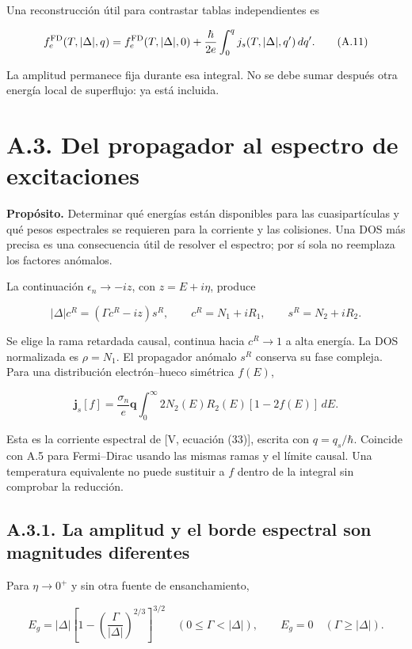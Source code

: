 \documentclass[
  spanish,
  10pt,
  a4paper,
]{article}
\begin{document}
Una reconstrucción útil para contrastar tablas independientes es

\[
f_e^{\rm FD}(T,|\Delta|,q)
=f_e^{\rm FD}(T,|\Delta|,0)
+\frac{\hbar}{2e}\int_0^q j_s(T,|\Delta|,q')\,dq'.
\tag{A.11}
\]

La amplitud permanece fija durante esa integral. No se debe sumar
después otra energía local de superflujo: ya está incluida.

\section{A.3. Del propagador al espectro de
excitaciones}\label{a.3.-del-propagador-al-espectro-de-excitaciones}

\textbf{Propósito.} Determinar qué energías están disponibles para las
cuasipartículas y qué pesos espectrales se requieren para la corriente y
las colisiones. Una DOS más precisa es una consecuencia útil de resolver
el espectro; por sí sola no reemplaza los factores anómalos.

La continuación \(\epsilon_n\to-iz\), con \(z=E+i\eta\), produce

\[
|\Delta|c^R=(\Gamma c^R-iz)s^R,
\qquad c^R=N_1+iR_1,\qquad s^R=N_2+iR_2.
\tag{A.12}
\]

Se elige la rama retardada causal, continua hacia \(c^R\to1\) a alta
energía. La DOS normalizada es \(\rho=N_1\). El propagador anómalo
\(s^R\) conserva su fase compleja. Para una distribución electrón--hueco
simétrica \(f(E)\),

\[
\mathbf j_s[f]=\frac{\sigma_n}{e}\mathbf q
\int_0^\infty 2N_2(E)R_2(E)[1-2f(E)]\,dE.
\tag{A.13}
\]

Esta es la corriente espectral de {[}V, ecuación (33){]}, escrita con
\(q=q_s/\hbar\). Coincide con A.5 para Fermi--Dirac usando las mismas
ramas y el límite causal. Una temperatura equivalente no puede sustituir
a \(f\) dentro de la integral sin comprobar la reducción.

\subsection{A.3.1. La amplitud y el borde espectral son magnitudes
diferentes}\label{a.3.1.-la-amplitud-y-el-borde-espectral-son-magnitudes-diferentes}

Para \(\eta\to0^+\) y sin otra fuente de ensanchamiento,

\[
E_g=|\Delta|\left[1-\left(\frac{\Gamma}{|\Delta|}\right)^{2/3}\right]^{3/2}
\quad(0\leq\Gamma<|\Delta|),
\qquad E_g=0\quad(\Gamma\geq|\Delta|).
\tag{A.14}
\]
\end{document}
